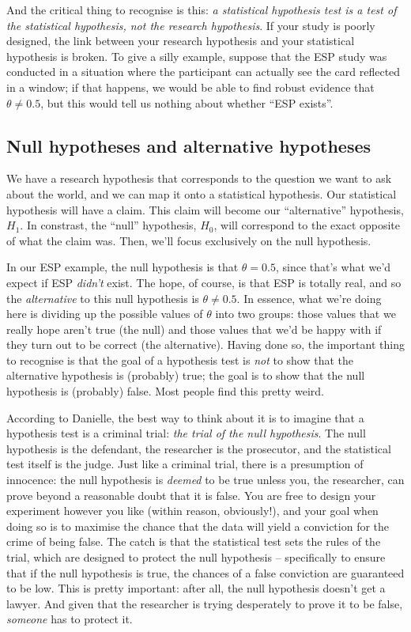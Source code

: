 \documentclass[
  11pt,
  a4paper,
  twoside,symmetric,openright]{book}
\theoremstyle{break}
\theoremstyle{break}
\begin{document}
And the critical thing to recognise is this: \emph{a statistical hypothesis test is a test of the statistical hypothesis, not the research hypothesis}. If your study is poorly designed, the link between your research hypothesis and your statistical hypothesis is broken. To give a silly example, suppose that the ESP study was conducted in a situation where the participant can actually see the card reflected in a window; if that happens, we would be able to find robust evidence that \(\theta \neq 0.5\), but this would tell us nothing about whether ``ESP exists''.

\subsection{Null hypotheses and alternative hypotheses}\label{null-hypotheses-and-alternative-hypotheses}

We have a research hypothesis that corresponds to the question we want to ask about the world, and we can map it onto a statistical hypothesis. Our statistical hypothesis will have a claim. This claim will become our ``alternative'' hypothesis, \(H_1\). In constrast, the ``null'' hypothesis, \(H_0\), will correspond to the exact opposite of what the claim was. Then, we'll focus exclusively on the null hypothesis.

In our ESP example, the null hypothesis is that \(\theta = 0.5\), since that's what we'd expect if ESP \emph{didn't} exist. The hope, of course, is that ESP is totally real, and so the \emph{alternative} to this null hypothesis is \(\theta \neq 0.5\). In essence, what we're doing here is dividing up the possible values of \(\theta\) into two groups: those values that we really hope aren't true (the null) and those values that we'd be happy with if they turn out to be correct (the alternative). Having done so, the important thing to recognise is that the goal of a hypothesis test is \emph{not} to show that the alternative hypothesis is (probably) true; the goal is to show that the null hypothesis is (probably) false. Most people find this pretty weird.

According to Danielle, the best way to think about it is to imagine that a hypothesis test is a criminal trial: \emph{the trial of the null hypothesis}. The null hypothesis is the defendant, the researcher is the prosecutor, and the statistical test itself is the judge. Just like a criminal trial, there is a presumption of innocence: the null hypothesis is \emph{deemed} to be true unless you, the researcher, can prove beyond a reasonable doubt that it is false. You are free to design your experiment however you like (within reason, obviously!), and your goal when doing so is to maximise the chance that the data will yield a conviction for the crime of being false. The catch is that the statistical test sets the rules of the trial, which are designed to protect the null hypothesis -- specifically to ensure that if the null hypothesis is true, the chances of a false conviction are guaranteed to be low. This is pretty important: after all, the null hypothesis doesn't get a lawyer. And given that the researcher is trying desperately to prove it to be false, \emph{someone} has to protect it.
\end{document}
